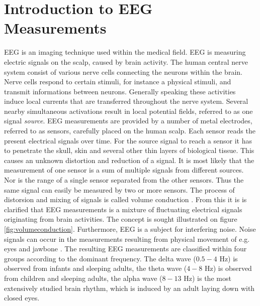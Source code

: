 \section{Introduction to EEG Measurements}\label{sec:EEG}
EEG is an imaging technique used within the medical field. EEG is measuring electric signals on the scalp, caused by brain activity. 
The human central nerve system consist of various nerve cells connecting the neurons within the brain. Nerve cells respond to certain stimuli, for instance a physical stimuli, and transmit informations between neurons.
Generally speaking these activities induce local currents that are transferred throughout the nerve system. 
Several nearby simultaneous activations result in local potential fields, referred to as one signal \textit{source}\cite{EEGsignalprocessing}. 
EEG measurements are provided by a number of metal electrodes, referred to as sensors, carefully placed on the human scalp. 
Each sensor reads the present electrical signals over time.
For the source signal to reach a sensor it has to penetrate the skull, skin and several other thin layers of biological tissue. 
This causes an unknown distortion and reduction of a signal.
It is most likely that the measurement of one sensor is a sum of multiple signals from different sources.
Nor is the range of a single sensor separated from the other sensors. 
Thus the same signal can easily be measured by two or more sensors.
The process of distorsion and mixing of signals is called volume conduction \cite[p. 68]{EEGsignalprocessing} \cite{Van2019}. 
From this it is is clarified that EEG measurements  
is a mixture of fluctuating electrical signals originating from brain activities.
The concept is sought illustrated on figure \ref{fig:volumeconduction}. 
Furthermore, EEG is a subject for interfering noise. Noise signals can occur in the measurements resulting from physical movement of e.g. eyes and jawbone \cite{fundamentalEEG}. 
The resulting EEG measurements are classified within four groups according to the dominant frequency. 
The delta wave ($0.5-4$ Hz) is observed from infants and sleeping adults, the theta wave ($4-8$ Hz) is observed from children and sleeping adults, the alpha wave ($8-13$ Hz) is the most extensively studied brain rhythm, which is induced by an adult laying down with closed eyes. 

